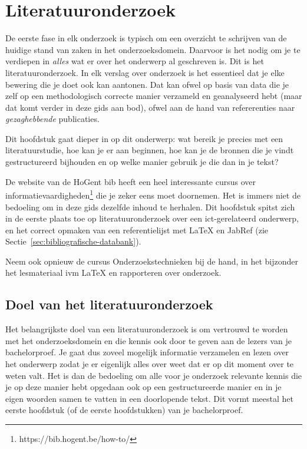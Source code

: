 \chapter{Literatuuronderzoek}
\label{ch:literatuuronderzoek}

De eerste fase in elk onderzoek is typisch om een overzicht te schrijven van de huidige stand van zaken in het onderzoeksdomein. Daarvoor is het nodig om je te verdiepen in \emph{alles} wat er over het onderwerp al geschreven is. Dit is het literatuuronderzoek. In elk verslag over onderzoek is het essentieel dat je elke bewering die je doet ook kan aantonen. Dat kan ofwel op basis van data die je zelf op een methodologisch correcte manier verzameld en geanalyseerd hebt (maar dat komt verder in deze gids aan bod), ofwel aan de hand van refererenties naar \emph{gezaghebbende} publicaties.

Dit hoofdstuk gaat dieper in op dit onderwerp: wat bereik je precies met een literatuurstudie, hoe kan je er aan beginnen, hoe kan je de bronnen die je vindt gestructureerd bijhouden en op welke manier gebruik je die dan in je tekst?

De website van de HoGent bib heeft een heel interessante cursus over informatievaardigheden\footnote{https://bib.hogent.be/how-to/} die je zeker eens moet doornemen. Het is immers niet de bedoeling om in deze gids dezelfde inhoud te herhalen. Dit hoofdstuk spitst zich in de eerste plaats toe op literatuuronderzoek over een ict-gerelateerd onderwerp, en het correct opmaken van een referentielijst met {\LaTeX} en JabRef (zie Sectie~\ref{sec:bibliografische-databank}).

Neem ook opnieuw de cursus Onderzoekstechnieken bij de hand, in het bijzonder het lesmateriaal ivm {\LaTeX} en rapporteren over onderzoek.

\section{Doel van het literatuuronderzoek}
\label{sec:doel-literatuuronderzoek}

Het belangrijkste doel van een literatuuronderzoek is om vertrouwd te worden met het onderzoeksdomein en die kennis ook door te geven aan de lezers van je bachelorproef. Je gaat dus zoveel mogelijk informatie verzamelen en lezen over het onderwerp zodat je er eigenlijk alles over weet dat er op dit moment over te weten valt. Het is dan de bedoeling om alle voor je onderzoek relevante kennis die je op deze manier hebt opgedaan ook op een gestructureerde manier en in je eigen woorden samen te vatten in een doorlopende tekst. Dit vormt meestal het eerste hoofdstuk (of de eerste hoofdstukken) van je bachelorproef.

